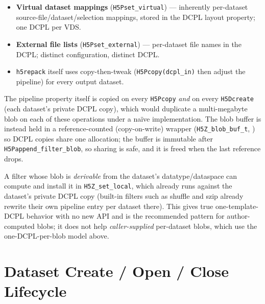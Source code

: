\documentclass[../RFC-HDFG-2026-003.tex]{subfiles}
\begin{document}
\begin{itemize}
\item \textbf{Virtual dataset mappings} (\texttt{H5Pset\_virtual}) ---
  inherently per-dataset source-file/dataset/selection mappings, stored
  in the DCPL layout property; one DCPL per VDS.
\item \textbf{External file lists} (\texttt{H5Pset\_external}) ---
  per-dataset file names in the DCPL; distinct configuration, distinct
  DCPL.
\item \texttt{h5repack} itself uses copy-then-tweak
  (\texttt{H5Pcopy(dcpl\_in)} then adjust the pipeline) for every output
  dataset.
\end{itemize}


The pipeline property itself is copied on every \texttt{H5Pcopy}
\emph{and} on every \texttt{H5Dcreate} (each dataset's private DCPL
copy), which would duplicate a multi-megabyte blob on each of these
operations under a na\"ive implementation. The blob buffer is instead
held in a reference-counted (copy-on-write) wrapper
(\texttt{H5Z\_blob\_buf\_t}, ) so
DCPL copies share one allocation; the buffer is immutable after
\texttt{H5Pappend\_filter\_blob}, so sharing is safe, and it is freed
when the last reference drops.


A filter whose blob is \emph{derivable} from the dataset's
datatype/dataspace can compute and install it in
\texttt{H5Z\_set\_local}, which already runs against the dataset's
private DCPL copy (built-in filters such as shuffle and szip already
rewrite their own pipeline entry per dataset there). This gives true
one-template-DCPL behavior with no new API and is the recommended
pattern for author-computed blobs; it does not help
\emph{caller-supplied} per-dataset blobs, which use the
one-DCPL-per-blob model above.


\section{Dataset Create / Open / Close Lifecycle}
\label{sec:blob-lifecycle}
\end{document}
